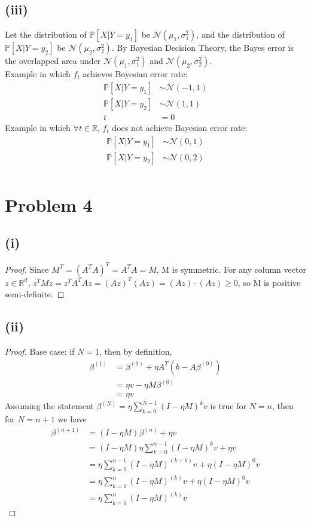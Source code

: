 \documentclass[twoside,11pt]{homework}
\begin{document}
\subsection*{(iii)}
	Let the distribution of $\mathbb{P}[X|Y=y_1]$ be $\mathcal{N}(\mu_1,\sigma_1^2)$, 
	and the distribution of $\mathbb{P}[X|Y=y_2]$ be $\mathcal{N}(\mu_2,\sigma_2^2)$.
	By Bayesian Decision Theory, the Bayes error is the overlapped area under $\mathcal{N}(\mu_1,\sigma_1^2)$
	and $\mathcal{N}(\mu_2,\sigma_2^2)$. \\
	Example in which $f_t$ achieves Bayesian error rate:
	\begin{align*}
		\mathbb{P}[X|Y=y_1] &\sim \mathcal{N}(-1, 1)\\
		\mathbb{P}[X|Y=y_2] &\sim \mathcal{N}(1, 1) \\
		t&=0
	\end{align*}
	Example in which $\forall t\in \mathbb{R}$, $f_t$ does not achieve Bayesian error rate:
	\begin{align*}
		\mathbb{P}[X|Y=y_1] &\sim \mathcal{N}(0, 1)\\
		\mathbb{P}[X|Y=y_2] &\sim \mathcal{N}(0, 2) \\
	\end{align*}


\section*{Problem 4} 
\subsection*{(i)}
	\begin{proof}
		Since $M^{T} = (A^{T}A)^{T} = A^{T}A = M$, M is symmetric. 
		For any column vector $z\in \mathbb{R}^d$, $z^TMz = z^TA^TAz = (Az)^T (Az) = (Az)\cdot(Az) \geq 0$, 
		so M is positive semi-definite.
	\end{proof}
\subsection*{(ii)}
	\begin{proof}
		Base case: if $N=1$, then by definition, 
		\begin{align*}
			\beta^{(1)} &= \beta^{(0)}+ \eta  A^{T} (b-A \beta^{(0)}) \\
			&= \eta v - \eta M \beta^{(0)} \\
			&= \eta v 
		\end{align*}
		Assuming the statement $\beta^{(N)} = \eta \sum_{k=0}^{N-1} (I-\eta M)^k v$ is true for $N=n$, then for $N=n+1$ we have
		\begin{align*}
			\beta^{(n+1)} &= (I-\eta M) \beta^{(n)} + \eta v \tag{definition} \\
			&= (I-\eta M) \eta  \sum_{k=0}^{n-1} (I-\eta M)^k v + \eta v \tag{induction hypothesis} \\
			&= \eta  \sum_{k=0}^{n-1} (I-\eta M)^{(k+1)} v + \eta (I-\eta M)^0 v \\
			&= \eta  \sum_{k=1}^{n} (I-\eta M)^{(k)} v + \eta (I-\eta M)^0 v \\
			&= \eta  \sum_{k=0}^{n} (I-\eta M)^{(k)} v
		\end{align*}
	\end{proof}
\end{document}
